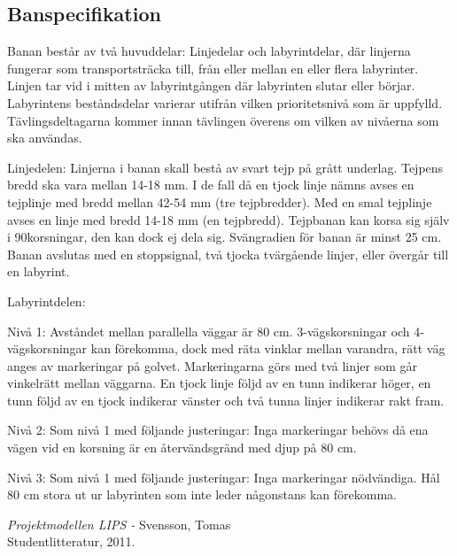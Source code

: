 \documentclass[a4paper,12pt]{article}
\begin{document}


\subsection{Banspecifikation} \label{app:bana}


Banan består av två huvuddelar: Linjedelar och labyrintdelar, där linjerna fungerar som transportsträcka till, från eller mellan en eller flera labyrinter. Linjen tar vid i mitten av labyrintgången där labyrinten slutar eller börjar. Labyrintens beståndsdelar varierar utifrån vilken prioritetsnivå som är uppfylld. Tävlingsdeltagarna kommer innan tävlingen överens om vilken av nivåerna som ska användas.

Linjedelen:
Linjerna i banan skall bestå av svart tejp på grått underlag. Tejpens bredd ska vara mellan 14-18 mm. I de fall då en tjock linje nämns avses en tejplinje med bredd mellan 42-54 mm (tre tejpbredder). Med en smal tejplinje avses en linje med bredd 14-18 mm (en tejpbredd). Tejpbanan kan korsa sig själv i 90\degree korsningar, den kan dock ej dela sig. Svängradien för banan är minst 25 cm. Banan avslutas med en stoppsignal, två tjocka tvärgående linjer, eller övergår till en labyrint.

Labyrintdelen:

\begin{list}{*}{}
\item Nivå 1: Avståndet mellan parallella väggar är 80 cm. 3-vägskorsningar och 4-vägskorsningar kan förekomma, dock med räta vinklar mellan varandra, rätt väg anges av markeringar på golvet. Markeringarna görs med två linjer som går vinkelrätt mellan väggarna. En tjock linje följd av en tunn indikerar höger, en tunn följd av en tjock indikerar vänster och två tunna linjer indikerar rakt fram. 
\item Nivå 2: Som nivå 1 med följande justeringar: Inga markeringar behövs då ena vägen vid en korsning är en återvändsgränd med djup på 80 cm.
\item Nivå 3: Som nivå 1 med följande justeringar: Inga markeringar nödvändiga. Hål 80 cm stora ut ur labyrinten som inte leder någonstans kan förekomma.
\end{list} 

\newpage


\begin{thebibliography}{99}
\textit{Projektmodellen LIPS - } Svensson, Tomas
\\Studentlitteratur, 2011.
\end{thebibliography}
\end{document}
